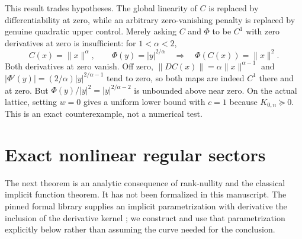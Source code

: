 \documentclass[11pt]{article}
\begin{document}
This result trades hypotheses. The global linearity of $C$ is replaced by
differentiability at zero, while an arbitrary zero-vanishing penalty is
replaced by genuine quadratic upper control. Merely asking $C$ and $\Phi$
to be $C^1$ with zero derivatives at zero is insufficient: for $1<\alpha<2$,
\[
 C(x)=\|x\|^\alpha,\qquad \Phi(y)=|y|^{2/\alpha}
 \quad\Longrightarrow\quad \Phi(C(x))=\|x\|^2.
\]
Both derivatives at zero vanish. Off zero,
$\|DC(x)\|=\alpha\|x\|^{\alpha-1}$ and
$|\Phi'(y)|=(2/\alpha)|y|^{2/\alpha-1}$ tend to zero, so both maps are indeed
$C^1$ there and at zero. But
$\Phi(y)/|y|^2=|y|^{2/\alpha-2}$ is unbounded above near zero. On the actual
lattice, setting $w=0$ gives a uniform lower bound with $c=1$ because
$K_{0,n}\succeq0$. This is an exact counterexample, not a numerical test.

\section{Exact nonlinear regular sectors}\label{sec:nonlinear-sector}
The next theorem is an analytic consequence of rank-nullity and the classical
implicit function theorem. It has not been formalized in this manuscript.
The pinned formal library supplies an implicit parametrization with derivative
the inclusion of the derivative kernel \cite{mathlib-implicit}; we construct
and use that parametrization explicitly below rather than assuming the curve
needed for the conclusion.
\end{document}
